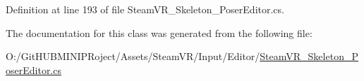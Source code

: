 Definition at line 193 of file Steam\+V\+R\+\_\+\+Skeleton\+\_\+\+Poser\+Editor.\+cs.



The documentation for this class was generated from the following file\+:\begin{DoxyCompactItemize}
\item 
O\+:/\+Git\+H\+U\+B\+M\+I\+N\+I\+P\+Roject/\+Assets/\+Steam\+V\+R/\+Input/\+Editor/\mbox{\hyperlink{_steam_v_r___skeleton___poser_editor_8cs}{Steam\+V\+R\+\_\+\+Skeleton\+\_\+\+Poser\+Editor.\+cs}}\end{DoxyCompactItemize}
